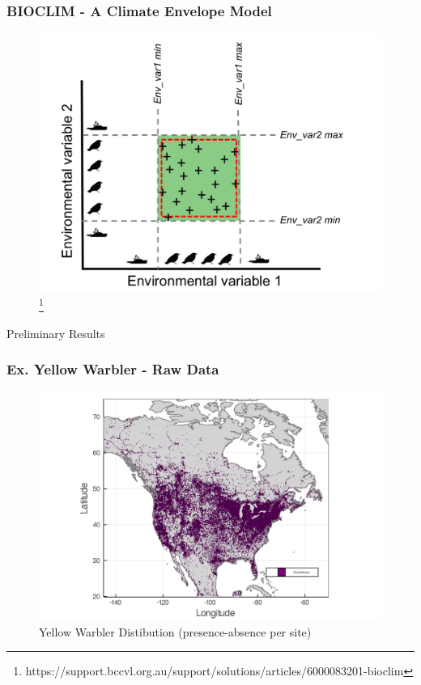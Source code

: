 \documentclass[10pt]{beamer}
\begin{document}
\begin{frame}
  \frametitle{BIOCLIM - A Climate Envelope Model}
  \begin{figure}
    \centering
    \hspace*{-0cm}\includegraphics[scale=0.25]{fig/bioclim_bccvl.png}\footnote{\tiny https://support.bccvl.org.au/support/solutions/articles/6000083201-bioclim}
  \end{figure}
\end{frame}

\begin{frame}
  \vfill
  \centering
  \huge Preliminary Results
  \vfill
\end{frame}

\begin{frame}
  \frametitle{Ex. Yellow Warbler - Raw Data}
  \begin{figure}
    \centering
    \hspace*{-0cm}\includegraphics[scale=0.17]{fig/01_raw_singlesp.png}
    \caption{Yellow Warbler Distibution (presence-absence per site)}
  \end{figure}
\end{frame}
\end{document}
